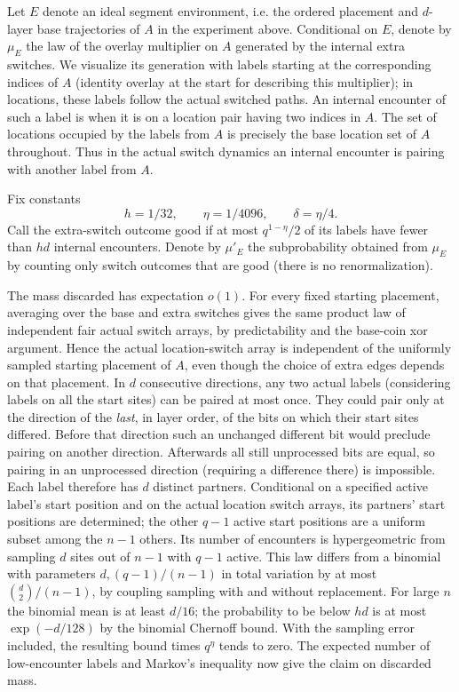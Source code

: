 Let \(E\) denote an ideal segment environment, i.e. the ordered placement and \(d\)-layer base trajectories of \(A\) in the experiment above. Conditional on \(E\), denote by \(\mu_E\) the law of the overlay multiplier on \(A\) generated by the internal extra switches. We visualize its generation with labels starting at the corresponding indices of \(A\) (identity overlay at the start for describing this multiplier); in locations, these labels follow the actual switched paths. An internal encounter of such a label is when it is on a location pair having two indices in \(A\). The set of locations occupied by the labels from \(A\) is precisely the base location set of \(A\) throughout. Thus in the actual switch dynamics an internal encounter is pairing with another label from \(A\).

Fix constants
\[
 h=1/32,\qquad \eta=1/4096,\qquad \delta=\eta/4 .
\]
Call the extra-switch outcome good if at most \(q^{1-\eta}/2\) of its labels have fewer than \(h d\) internal encounters. Denote by \(\mu'_E\) the subprobability obtained from \(\mu_E\) by counting only switch outcomes that are good (there is no renormalization).

The mass discarded has expectation \(o(1)\). For every fixed starting placement, averaging over the base and extra switches gives the same product law of independent fair actual switch arrays, by predictability and the base-coin xor argument. Hence the actual location-switch array is independent of the uniformly sampled starting placement of \(A\), even though the choice of extra edges depends on that placement. In \(d\) consecutive directions, any two actual labels (considering labels on all the start sites) can be paired at most once. They could pair only at the direction of the \emph{last}, in layer order, of the bits on which their start sites differed. Before that direction such an unchanged different bit would preclude pairing on another direction. Afterwards all still unprocessed bits are equal, so pairing in an unprocessed direction (requiring a difference there) is impossible. Each label therefore has \(d\) distinct partners. Conditional on a specified active label's start position and on the actual location switch arrays, its partners' start positions are determined; the other \(q-1\) active start positions are a uniform subset among the \(n-1\) others. Its number of encounters is hypergeometric from sampling \(d\) sites out of \(n-1\) with \(q-1\) active. This law differs from a binomial with parameters \(d,(q-1)/(n-1)\) in total variation by at most \(\binom{d}{2}/(n-1)\), by coupling sampling with and without replacement. For large \(n\) the binomial mean is at least \(d/16\); the probability to be below \(hd\) is at most \(\exp(-d/128)\) by the binomial Chernoff bound. With the sampling error included, the resulting bound times \(q^\eta\) tends to zero. The expected number of low-encounter labels and Markov's inequality now give the claim on discarded mass.

